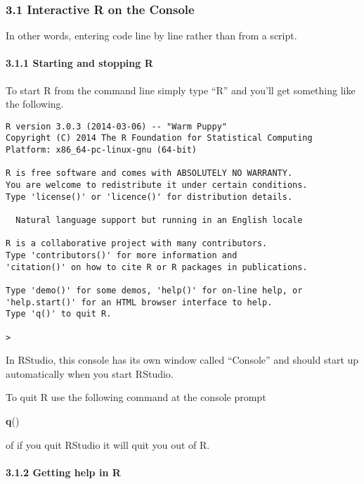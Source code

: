 \documentclass[
]{article}
\newenvironment{Shaded}{\begin{snugshade}}{\end{snugshade}}
\newcommand{\FunctionTok}[1]{\textcolor[rgb]{0.13,0.29,0.53}{\textbf{#1}}}
\newcommand{\NormalTok}[1]{#1}
\begin{document}
\subsubsection{3.1 Interactive R on the
Console}\label{interactive-r-on-the-console}

In other words, entering code line by line rather than from a script.

\paragraph{3.1.1 Starting and stopping R}\label{starting-and-stopping-r}

To start R from the command line simply type ``R'' and you'll get
something like the following.

\begin{verbatim}
R version 3.0.3 (2014-03-06) -- "Warm Puppy"
Copyright (C) 2014 The R Foundation for Statistical Computing
Platform: x86_64-pc-linux-gnu (64-bit)

R is free software and comes with ABSOLUTELY NO WARRANTY.
You are welcome to redistribute it under certain conditions.
Type 'license()' or 'licence()' for distribution details.

  Natural language support but running in an English locale

R is a collaborative project with many contributors.
Type 'contributors()' for more information and
'citation()' on how to cite R or R packages in publications.

Type 'demo()' for some demos, 'help()' for on-line help, or
'help.start()' for an HTML browser interface to help.
Type 'q()' to quit R.

>
\end{verbatim}

In RStudio, this console has its own window called ``Console'' and
should start up automatically when you start RStudio.

To quit R use the following command at the console prompt

\begin{Shaded}
\begin{Highlighting}[]
\FunctionTok{q}\NormalTok{()}
\end{Highlighting}
\end{Shaded}

of if you quit RStudio it will quit you out of R.

\paragraph{3.1.2 Getting help in R}\label{getting-help-in-r}
\end{document}
